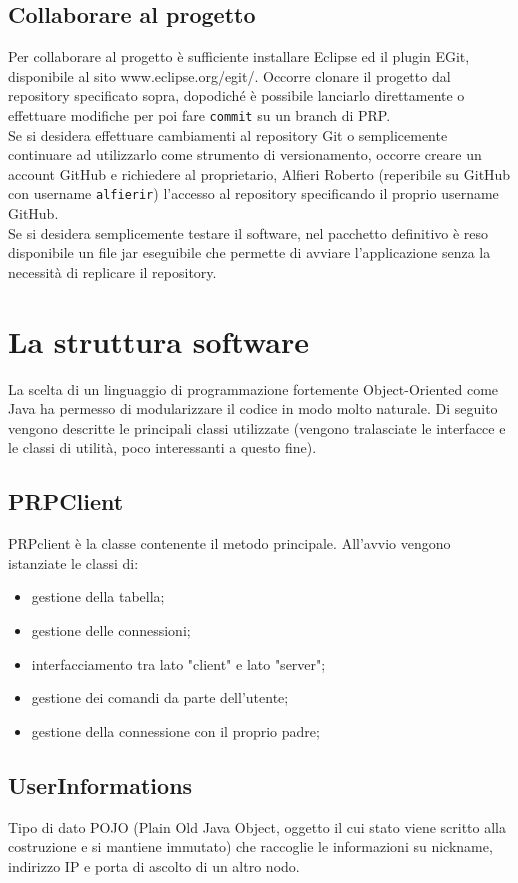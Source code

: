 \documentclass[10pt]{article} %
\begin{document}
\subsection{Collaborare al progetto}
Per collaborare al progetto è sufficiente installare Eclipse ed il plugin EGit, disponibile al sito www.eclipse.org/egit/. Occorre clonare il progetto dal repository specificato sopra, dopodiché è possibile lanciarlo direttamente o effettuare modifiche per poi fare {\tt commit} su un branch di PRP. 
	\\ Se si desidera effettuare cambiamenti al repository Git o semplicemente continuare ad utilizzarlo come strumento di versionamento, occorre creare un account GitHub e richiedere al proprietario, Alfieri Roberto (reperibile su GitHub con username {\tt alfierir}) l'accesso al repository specificando il proprio username GitHub.
	\\ Se si desidera semplicemente testare il software, nel pacchetto definitivo è reso disponibile un file jar eseguibile che permette di avviare l'applicazione senza la necessità di replicare il repository.


\section{La struttura software}
La scelta di un linguaggio di programmazione fortemente Object-Oriented come Java ha permesso di modularizzare il codice in modo molto naturale. Di seguito vengono descritte le principali classi utilizzate (vengono tralasciate le interfacce e le classi di utilità, poco interessanti a questo fine).
\subsection{PRPClient}
	PRPclient è la classe contenente il metodo principale. All'avvio vengono istanziate le classi di:
	\begin{itemize}
		\item gestione della tabella;
		\item gestione delle connessioni;
		\item interfacciamento tra lato "client" e lato "server";
		\item gestione dei comandi da parte dell'utente;
		\item gestione della connessione con il proprio padre;
	\end{itemize}

\subsection{UserInformations}
	Tipo di dato POJO (Plain Old Java Object, oggetto il cui stato viene scritto alla costruzione e si mantiene immutato) che raccoglie le informazioni su nickname, indirizzo IP e porta di ascolto di un altro nodo.
\end{document}
